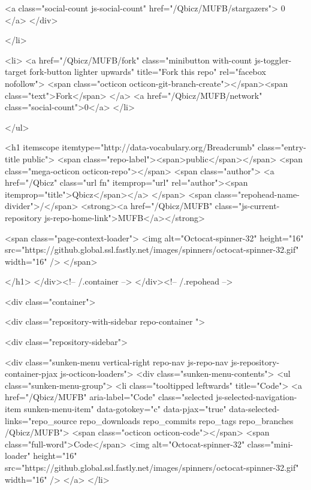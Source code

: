       <a class="social-count js-social-count" href="/Qbicz/MUFB/stargazers">
        0
      </a>
  </div>

  </li>


        <li>
          <a href="/Qbicz/MUFB/fork" class="minibutton with-count js-toggler-target fork-button lighter upwards" title="Fork this repo" rel="facebox nofollow">
            <span class="octicon octicon-git-branch-create"></span><span class="text">Fork</span>
          </a>
          <a href="/Qbicz/MUFB/network" class="social-count">0</a>
        </li>


</ul>

        <h1 itemscope itemtype="http://data-vocabulary.org/Breadcrumb" class="entry-title public">
          <span class="repo-label"><span>public</span></span>
          <span class="mega-octicon octicon-repo"></span>
          <span class="author">
            <a href="/Qbicz" class="url fn" itemprop="url" rel="author"><span itemprop="title">Qbicz</span></a>
          </span>
          <span class="repohead-name-divider">/</span>
          <strong><a href="/Qbicz/MUFB" class="js-current-repository js-repo-home-link">MUFB</a></strong>

          <span class="page-context-loader">
            <img alt="Octocat-spinner-32" height="16" src="https://github.global.ssl.fastly.net/images/spinners/octocat-spinner-32.gif" width="16" />
          </span>

        </h1>
      </div><!-- /.container -->
    </div><!-- /.repohead -->

    <div class="container">
      

      <div class="repository-with-sidebar repo-container  ">

        <div class="repository-sidebar">
            

<div class="sunken-menu vertical-right repo-nav js-repo-nav js-repository-container-pjax js-octicon-loaders">
  <div class="sunken-menu-contents">
    <ul class="sunken-menu-group">
      <li class="tooltipped leftwards" title="Code">
        <a href="/Qbicz/MUFB" aria-label="Code" class="selected js-selected-navigation-item sunken-menu-item" data-gotokey="c" data-pjax="true" data-selected-links="repo_source repo_downloads repo_commits repo_tags repo_branches /Qbicz/MUFB">
          <span class="octicon octicon-code"></span> <span class="full-word">Code</span>
          <img alt="Octocat-spinner-32" class="mini-loader" height="16" src="https://github.global.ssl.fastly.net/images/spinners/octocat-spinner-32.gif" width="16" />
</a>      </li>

